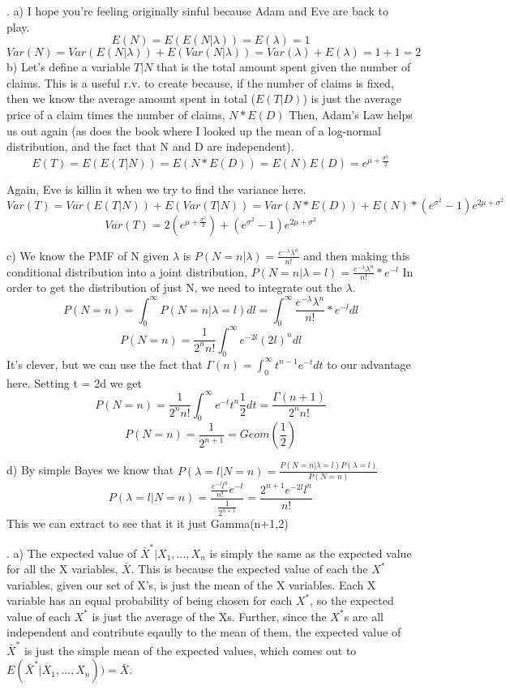 \documentclass[11pt]{article}
\begin{document}
\bigskip


. 
	a) I hope you're feeling originally sinful because Adam and Eve are back to play. 
	$$E(N) = E(E(N|\lambda)) = E(\lambda) = \boxed{1}$$
	$$Var(N) = Var(E(N|\lambda)) + E(Var(N|\lambda)) = Var(\lambda) + E(\lambda) = 1+1 = \boxed{2}$$
\smallskip
	b) Let's define a variable $T|N$ that is the total amount spent given the number of claims.  This is a useful r.v. to create because, if the number of claims is fixed, then we know the average amount spent in total ($E(T|D)$) is just the average price of a claim times the number of claims, $N*E(D)$
	Then, Adam's Law helps us out again (as does the book where I looked up the mean of a log-normal distribution, and the fact that N and D are independent).
	$$E(T) = E(E(T|N)) = E(N*E(D)) = E(N)E(D) = \boxed{e^{\mu+\frac{\sigma^2}{2}} }$$

	Again, Eve is killin it when we try to find the variance here.  
	$$Var(T) = Var(E(T|N)) + E(Var(T|N)) = Var(N*E(D)) + E(N)*(e^{\sigma^2}-1)e^{2\mu+\sigma^2}$$
	$$\boxed{Var(T) = 2(e^{\mu+\frac{\sigma^2}{2}}) + (e^{\sigma^2}-1)e^{2\mu + \sigma^2} }$$


\smallskip
	c) We know the PMF of N given $\lambda$ is $P(N=n|\lambda) = \frac{e^{-\lambda}\lambda^n}{n!}$ and then making this conditional distribution into a joint distribution, $P(N=n | \lambda = l) = \frac{e^{-\lambda}\lambda^n}{n!}*e^{-l}$
	In order to get the distribution of just N, we need to integrate out the $\lambda$.  
	$$P(N=n) = \int^\infty_0 P(N=n | \lambda = l)dl = \int^\infty_0 \frac{e^{-\lambda}\lambda^n}{n!}*e^{-l}dl$$
	$$ P(N=n) = \frac{1}{2^nn!}\int^\infty_0e^{-2l}(2l)^ndl$$
	It's clever, but we can use the fact that $\Gamma(n) = \int^\infty_0t^{n-1}e^{-t}dt$ to our advantage here. 
	Setting t = 2d we get
	$$P(N=n) = \frac{1}{2^nn!}\int^\infty_0e^{-t}t^n\frac{1}{2}dt = \frac{\Gamma(n+1)}{2^nn!}$$
	$$\boxed{P(N=n) = \frac{1}{2^{n+1}} = Geom(\frac{1}{2})}$$

\smallskip
	d) By simple Bayes we know that $P(\lambda = l | N=n) = \frac{P(N=n | \lambda = l)P(\lambda = l)}{P(N=n)}$
	$$P(\lambda = l | N=n) = \frac{\frac{e^{-l}{l^n}}{n!}e^{-l}}{\frac{1}{2^{n+1}}} = \boxed{\frac{2^{n+1}e^{-2l}l^n}{n!}}$$
	This we can extract to see that it it just Gamma(n+1,2)


	

\bigskip

. 
    a) The expected value of $\bar{X}^* | X_1,\dots,X_n$ is simply the same as the expected value for all the X variables, $\bar{X}$.  This is because the expected value of each the $X^* $ variables, given our set of X's, is just the mean of the X variables.  Each X variable has an equal probability of being chosen for each $X^* $, so the expected value of each $X^* $ is just the average of the Xs.  Further, since the $X^*$s are all independent and contribute eqaully to the mean of them, the expected value of $\bar{X}^* $ is just the simple mean of the expected values, which comes out to $\boxed{E(\bar{X}^* | X_1,\dots,X_n)) = \bar{X}} $.
\end{document}

